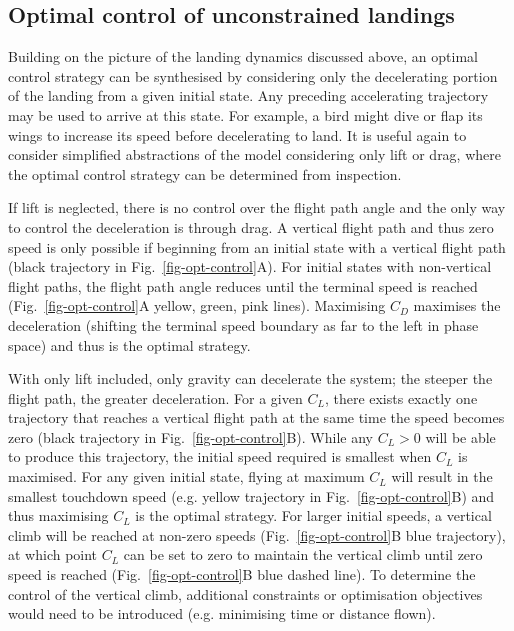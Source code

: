 \subsection{Optimal control of unconstrained landings} \label{sec-results-optcontrol}

Building on the picture of the landing dynamics discussed above, an optimal control strategy can be synthesised by considering only the decelerating portion of the landing from a given initial state. Any preceding accelerating trajectory may be used to arrive at this state. For example, a bird might dive or flap its wings to increase its speed before decelerating to land. It is useful again to consider simplified abstractions of the model considering only lift or drag, where the optimal control strategy can be determined from inspection.

If lift is neglected, there is no control over the flight path angle and the only way to control the deceleration is through drag. A vertical flight path and thus zero speed is only possible if beginning from an initial state with a vertical flight path (black trajectory in Fig.~\ref{fig-opt-control}A). For initial states with non-vertical flight paths, the flight path angle reduces until the terminal speed is reached (Fig.~\ref{fig-opt-control}A yellow, green, pink lines). Maximising $C_D$ maximises the deceleration (shifting the terminal speed boundary as far to the left in phase space) and thus is the optimal strategy.

With only lift included, only gravity can decelerate the system; the steeper the flight path, the greater deceleration. For a given $C_L$, there exists exactly one trajectory that reaches a vertical flight path at the same time the speed becomes zero (black trajectory in Fig.~\ref{fig-opt-control}B). While any $C_L>0$ will be able to produce this trajectory, the initial speed required is smallest when $C_L$ is maximised. For any given initial state, flying at maximum $C_L$ will result in the smallest touchdown speed (e.g. yellow trajectory in Fig.~\ref{fig-opt-control}B) and thus maximising $C_L$ is the optimal strategy. For larger initial speeds, a vertical climb will be reached at non-zero speeds (Fig.~\ref{fig-opt-control}B blue trajectory), at which point $C_L$ can be set to zero to maintain the vertical climb until zero speed is reached (Fig.~\ref{fig-opt-control}B blue dashed line). To determine the control of the vertical climb, additional constraints or optimisation objectives would need to be introduced (e.g. minimising time or distance flown).


